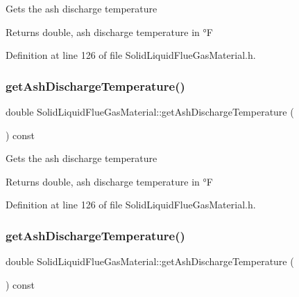 Gets the ash discharge temperature \begin{DoxyReturn}{Returns}
double, ash discharge temperature in °F 
\end{DoxyReturn}


Definition at line 126 of file Solid\+Liquid\+Flue\+Gas\+Material.\+h.

\mbox{\label{class_solid_liquid_flue_gas_material_ab233d4e27397cc74fbe2d3084e4e6f7c}} 
\subsubsection{\texorpdfstring{get\+Ash\+Discharge\+Temperature()}{getAshDischargeTemperature()}\hspace{0.1cm}{\footnotesize\ttfamily [2/3]}}
{\footnotesize\ttfamily double Solid\+Liquid\+Flue\+Gas\+Material\+::get\+Ash\+Discharge\+Temperature (\begin{DoxyParamCaption}{ }\end{DoxyParamCaption}) const\hspace{0.3cm}{\ttfamily [inline]}}

Gets the ash discharge temperature \begin{DoxyReturn}{Returns}
double, ash discharge temperature in °F 
\end{DoxyReturn}


Definition at line 126 of file Solid\+Liquid\+Flue\+Gas\+Material.\+h.

\mbox{\label{class_solid_liquid_flue_gas_material_ab233d4e27397cc74fbe2d3084e4e6f7c}} 
\subsubsection{\texorpdfstring{get\+Ash\+Discharge\+Temperature()}{getAshDischargeTemperature()}\hspace{0.1cm}{\footnotesize\ttfamily [3/3]}}
{\footnotesize\ttfamily double Solid\+Liquid\+Flue\+Gas\+Material\+::get\+Ash\+Discharge\+Temperature (\begin{DoxyParamCaption}{ }\end{DoxyParamCaption}) const\hspace{0.3cm}{\ttfamily [inline]}}

